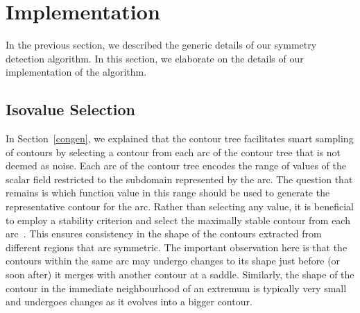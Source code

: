 \documentclass[review,journal]{vgtc}         %
\begin{document}
\section{Implementation}
In the previous section, we described the generic details of our symmetry
detection algorithm. In this section, we elaborate on the details of our 
implementation of the algorithm.
\subsection{Isovalue Selection}
In Section~\ref{congen}, we explained that the contour tree facilitates smart
sampling of contours by selecting a contour from each arc of the contour tree
that is not deemed as noise. Each arc of the contour tree encodes the range
of values of the scalar field restricted to the subdomain represented by the arc.
The question that remains is which function value in this range should be used
to generate the representative contour for the arc. Rather than selecting any 
value, it is beneficial to employ a stability criterion and select the
maximally stable contour from each arc~\cite{MatasCUP04}. This ensures consistency
in the shape of the contours extracted from different regions that are symmetric.
The important observation here is that the contours within the same arc
may undergo changes to its shape just before (or soon after) it merges 
with another contour at a saddle. Similarly, the shape of the contour in the
immediate neighbourhood of an extremum is typically very small and undergoes
changes as it evolves into a bigger contour. 
\end{document}
